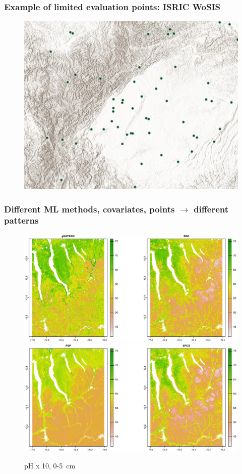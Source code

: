 \documentclass[aspectratio=169]{beamer}
\begin{document}
\begin{frame}
  \frametitle{Example of limited evaluation points: ISRIC WoSIS}
\begin{figure}
    \centering
\includegraphics[height=0.7\textheight]{./graphics_david/SoilGridsProfiles_Chengdu.png}
\end{figure}
\end{frame}

\begin{frame}
  \frametitle{Different ML methods, covariates,  points $\to$ different patterns}
    \begin{figure}
        \includegraphics[width=0.49\linewidth]{./graphics_david/Fig07a.png}
        \includegraphics[width=0.49\linewidth]{./graphics_david/Fig07b.png}
\par        
{\hfill        
        {pH x 10, 0-5~cm} \hfill}
    \end{figure}
\end{frame}
\end{document}
